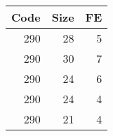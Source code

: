 \begin{table}[ht]
\centering
\begin{tabular}{rrr}
  \hline
Code & Size & FE \\ 
  \hline
290 & 28 & 5 \\ 
  290 & 30 & 7 \\ 
  290 & 24 & 6 \\ 
  290 & 24 & 4 \\ 
  290 & 21 & 4 \\ 
   \hline
\end{tabular}
\end{table}
